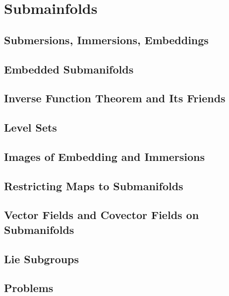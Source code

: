 \chapter{Submainfolds}
\section{Submersions, Immersions, Embeddings}
\section{Embedded Submanifolds}
\section{Inverse Function Theorem and Its Friends}
\section{Level Sets}
\section{Images of Embedding and Immersions}
\section{Restricting Maps to Submanifolds}
\section{Vector Fields and Covector Fields on Submanifolds}
\section{Lie Subgroups}
\section{Problems}